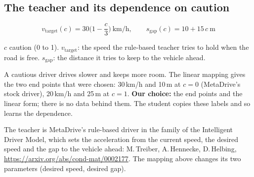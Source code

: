 \subsection{The teacher and its dependence on caution}
\[v_{\text{target}}(c)=30\Big(1-\frac c3\Big)\ \text{km/h},\qquad s_{\text{gap}}(c)=10+15\,c\ \text{m}\]
\begin{description}[leftmargin=2.6cm,style=nextline]
\item[Symbols] $c$ caution (0 to 1). $v_{\text{target}}$: the speed the rule-based teacher tries to hold when the road is free. $s_{\text{gap}}$: the distance it tries to keep to the vehicle ahead.
\item[Why] A cautious driver drives slower and keeps more room. The linear mapping gives the two end points that were chosen: 30\,km/h and 10\,m at $c=0$ (MetaDrive's stock driver), 20\,km/h and 25\,m at $c=1$. \textbf{Our choice:} the end points and the linear form; there is no data behind them. The student copies these labels and so learns the dependence.
\item[Source of the teacher] The teacher is MetaDrive's rule-based driver in the family of the Intelligent Driver Model, which sets the acceleration from the current speed, the desired speed and the gap to the vehicle ahead: M.\,Treiber, A.\,Hennecke, D.\,Helbing, \url{https://arxiv.org/abs/cond-mat/0002177}. The mapping above changes its two parameters (desired speed, desired gap).
\end{description}

